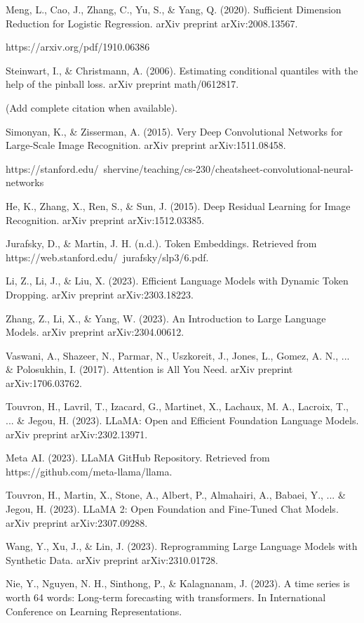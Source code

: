 \begin{thebibliography}{99}
	 Meng, L., Cao, J., Zhang, C., Yu, S., \& Yang, Q. (2020). Sufficient Dimension Reduction for Logistic Regression. arXiv preprint arXiv:2008.13567.

	 https://arxiv.org/pdf/1910.06386

	 Steinwart, I., \& Christmann, A. (2006). Estimating conditional quantiles with the help of the pinball loss. arXiv preprint math/0612817.

	 (Add complete citation when available).

	 Simonyan, K., \& Zisserman, A. (2015). Very Deep Convolutional Networks for Large-Scale Image Recognition. arXiv preprint arXiv:1511.08458.

	 https://stanford.edu/~shervine/teaching/cs-230/cheatsheet-convolutional-neural-networks

	 He, K., Zhang, X., Ren, S., \& Sun, J. (2015). Deep Residual Learning for Image Recognition. arXiv preprint arXiv:1512.03385.

	 Jurafsky, D., \& Martin, J. H. (n.d.). Token Embeddings. Retrieved from https://web.stanford.edu/~jurafsky/slp3/6.pdf.

	 Li, Z., Li, J., \& Liu, X. (2023). Efficient Language Models with Dynamic Token Dropping. arXiv preprint arXiv:2303.18223.

	 Zhang, Z., Li, X., \& Yang, W. (2023). An Introduction to Large Language Models. arXiv preprint arXiv:2304.00612.

	 Vaswani, A., Shazeer, N., Parmar, N., Uszkoreit, J., Jones, L., Gomez, A. N., ... \& Polosukhin, I. (2017). Attention is All You Need. arXiv preprint arXiv:1706.03762.

	 Touvron, H., Lavril, T., Izacard, G., Martinet, X., Lachaux, M. A., Lacroix, T., ... \& Jegou, H. (2023). LLaMA: Open and Efficient Foundation Language Models. arXiv preprint arXiv:2302.13971.

	 Meta AI. (2023). LLaMA GitHub Repository. Retrieved from https://github.com/meta-llama/llama.

	 Touvron, H., Martin, X., Stone, A., Albert, P., Almahairi, A., Babaei, Y., ... \& Jegou, H. (2023). LLaMA 2: Open Foundation and Fine-Tuned Chat Models. arXiv preprint arXiv:2307.09288.

	 Wang, Y., Xu, J., \& Lin, J. (2023). Reprogramming Large Language Models with Synthetic Data. arXiv preprint arXiv:2310.01728.

	 Nie, Y., Nguyen, N. H., Sinthong, P., \& Kalagnanam, J. (2023). A time series is worth 64 words: Long-term forecasting with transformers. In International Conference on Learning Representations.

\end{thebibliography}
